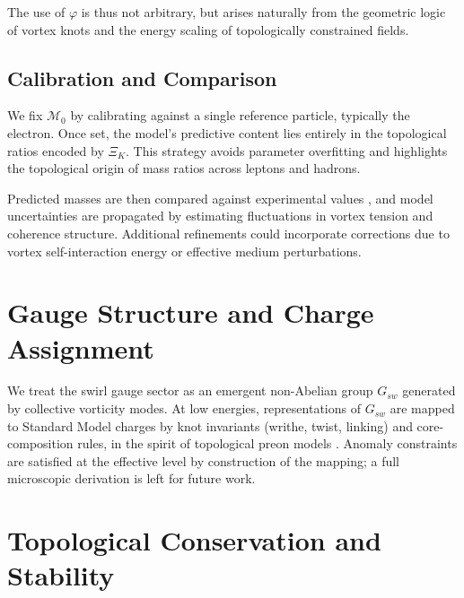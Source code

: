 \documentclass[12pt]{article}
\begin{document}
    The use of $\varphi$ is thus not arbitrary, but arises naturally from the geometric logic of vortex knots and the energy scaling of topologically constrained fields.


    \subsection{Calibration and Comparison}

    We fix $\mathcal{M}_0$ by calibrating against a single reference particle, typically the electron. Once set, the model's predictive content lies entirely in the topological ratios encoded by $\Xi_K$. This strategy avoids parameter overfitting and highlights the topological origin of mass ratios across leptons and hadrons.

    Predicted masses are then compared against experimental values \cite{PDG2024}, and model uncertainties are propagated by estimating fluctuations in vortex tension and coherence structure. Additional refinements could incorporate corrections due to vortex self-interaction energy or effective medium perturbations.


    \section{Gauge Structure and Charge Assignment}

    We treat the swirl gauge sector as an emergent non-Abelian group $G_{\!sw}$ generated by collective vorticity modes. At low energies, representations of $G_{\!sw}$ are mapped to Standard Model charges by knot invariants (writhe, twist, linking) and core-composition rules, in the spirit of topological preon models \cite{BilsonThompson2007}. Anomaly constraints are satisfied at the effective level by construction of the mapping; a full microscopic derivation is left for future work.

    \section{Topological Conservation and Stability}
\end{document}
